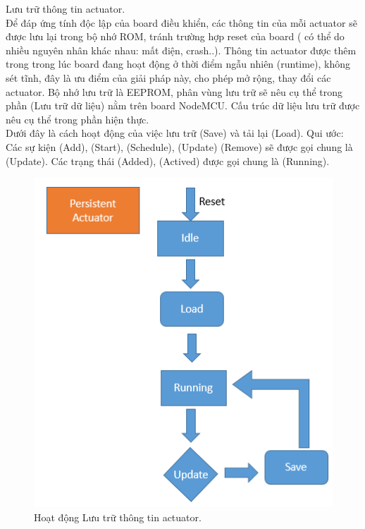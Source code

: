 \documentclass[a4paper,12pt,oneside]{article}
\begin{document}
\noindent Lưu trữ thông tin actuator.\\
\noindent Để đáp ứng tính độc lập của board điều khiển, các thông tin của mỗi actuator sẽ được lưu lại trong bộ nhớ ROM, tránh trường hợp reset của board ( có thể do nhiều nguyên nhân khác nhau: mất điện, crash..). Thông tin actuator được thêm trong trong lúc board đang hoạt động ở thời điểm ngẫu nhiên (runtime), không sét tĩnh, đây là ưu điểm của giải pháp này, cho phép mở rộng, thay đổi các actuator. Bộ nhớ lưu trữ là EEPROM, phân vùng lưu trữ sẽ nêu cụ thể trong phần (Lưu trữ dữ liệu) nằm trên board NodeMCU. Cấu trúc dữ liệu lưu trữ được nêu cụ thể trong phần hiện thực.\\
Dưới đây là cách hoạt động của việc lưu trữ (Save) và tải lại (Load). Qui ước: Các sự kiện (Add), (Start), (Schedule), (Update) (Remove) sẽ được gọi chung là (Update). Các trạng thái (Added), (Actived) được gọi chung là (Running).
\begin{center}
\begin{figure}[h!]
\begin{center}
\includegraphics[scale=.6]{hinh/persistent_actuator.PNG}
\end{center}
\caption{Hoạt động Lưu trữ thông tin actuator.}
\end{figure}
\end{center}
\end{document}
